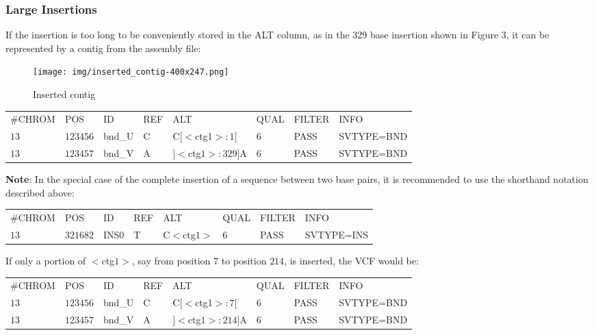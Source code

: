 \documentclass[8pt]{article}
\begin{document}
\subsubsection{Large Insertions}
If the insertion is too long to be conveniently stored in the ALT column, as in the 329 base insertion shown in Figure 3, it can be represented by a contig from the assembly file:

\begin{figure}[h]
\centering
\texttt{[image: img/inserted\_contig-400x247.png]}
\caption{Inserted contig}
\end{figure}

\vspace{0.3cm}
\small
\begin{tabular}{ l l l l l l l l }
\#CHROM & POS & ID & REF & ALT & QUAL & FILTER & INFO \\
$13$ & $123456$ & bnd\_U & C & C$[<$ctg1$>:1[$ & $6$ & PASS & SVTYPE=BND \\
$13$ & $123457$ & bnd\_V & A & $]<$ctg$1>:329]$A & $6$ & PASS & SVTYPE=BND \\
\end{tabular}
\normalsize
\vspace{0.3cm}

\textbf{Note}: In the special case of the complete insertion of a sequence between two base pairs, it is recommended to use the shorthand notation described above:

\vspace{0.3cm}
\begin{tabular}{ l l l l l l l l }
\#CHROM & POS & ID & REF & ALT & QUAL & FILTER & INFO \\
$13$ & $321682$ & INS0 & T & C$<$ctg$1>$ & $6$ & PASS & SVTYPE=INS \\
\end{tabular}
\vspace{0.3cm}

If only a portion of $<$ctg$1>$, say from position $7$ to position $214$, is inserted, the VCF would be:
\par\nobreak
\vspace{0.3cm}
\small
\begin{tabular}{ l l l l l l l l }
\#CHROM & POS & ID & REF & ALT & QUAL & FILTER & INFO \\
$13$ & $123456$ & bnd\_U & C & C$[<$ctg1$>:7[$ & $6$ & PASS & SVTYPE=BND \\
$13$ & $123457$ & bnd\_V & A & $]<$ctg$1>:214]$A & $6$ & PASS & SVTYPE=BND \\
\end{tabular}
\normalsize
\vspace{0.3cm}
\end{document}
